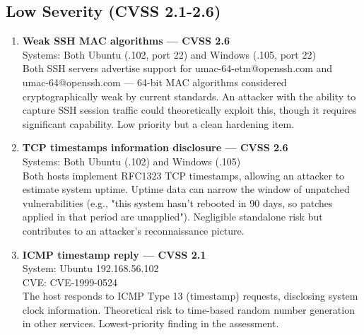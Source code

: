 \documentclass[12pt]{article}
\begin{document}
\subsection{Low Severity (CVSS 2.1-2.6)}
\begin{enumerate}
	\item[6.~7.] \textbf{Weak SSH MAC algorithms — CVSS 2.6}\\
		Systems: Both Ubuntu (.102, port 22) and Windows (.105, port 22)\\
		Both SSH servers advertise support for umac-64-etm@openssh.com and umac-64@openssh.com — 64-bit MAC algorithms considered cryptographically weak by current standards. An attacker with the ability to capture SSH session traffic could theoretically exploit this, though it requires significant capability. Low priority but a clean hardening item.
	\item[8.~9.] \textbf{TCP timestamps information disclosure — CVSS 2.6}\\
		Systems: Both Ubuntu (.102) and Windows (.105)\\
		Both hosts implement RFC1323 TCP timestamps, allowing an attacker to estimate system uptime. Uptime data can narrow the window of unpatched vulnerabilities (e.g., "this system hasn't rebooted in 90 days, so patches applied in that period are unapplied"). Negligible standalone risk but contributes to an attacker's reconnaissance picture.
	\item[10] \textbf{ICMP timestamp reply — CVSS 2.1}\\
		System: Ubuntu 192.168.56.102\\
		CVE: CVE-1999-0524\\
		The host responds to ICMP Type 13 (timestamp) requests, disclosing system clock information. Theoretical risk to time-based random number generation in other services. Lowest-priority finding in the assessment.
\end{enumerate}
\end{document}

